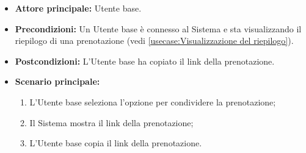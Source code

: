 \label{usecase:Condividi la prenotazione}
\begin{itemize}
	\item \textbf{Attore principale:} Utente base.

	\item \textbf{Precondizioni:}
	      Un Utente base è connesso al Sistema e sta visualizzando il riepilogo
	      di una prenotazione (vedi \autoref{usecase:Visualizzazione del riepilogo}).

	\item \textbf{Postcondizioni:}
	      L'Utente base ha copiato il link della prenotazione.

	\item \textbf{Scenario principale:}
	      \begin{enumerate}
		      \item L'Utente base seleziona l'opzione per condividere la prenotazione;
		      \item Il Sistema mostra il link della prenotazione;
		      \item L'Utente base copia il link della prenotazione.
	      \end{enumerate}
\end{itemize}

